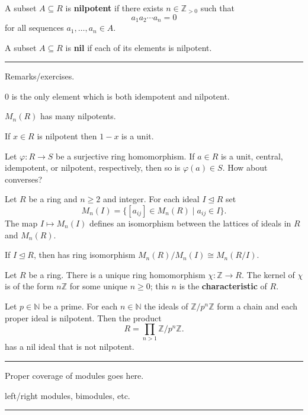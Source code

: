 \documentclass[12pt]{article}
\newcommand{\keyword}[1]{\textbf{#1}}
\newcommand{\sepline}{\rule{\textwidth}{0.4pt}}
\theoremstyle{definition}
\newcommand{\N}{\mathbb{N}}
\newcommand{\Z}{\mathbb{Z}}
\renewcommand{\phi}{\varphi}
\newcommand{\<}{\left\langle}
\renewcommand{\>}{\right\rangle}
\newcommand{\iso}{\cong}
\newcommand{\seq}{\subseteq}
\newcommand{\teq}{\trianglelefteq}
\renewcommand{\_}[1]{{_{#1}}}
\begin{document}
A subset $A \seq R$ is \keyword{nilpotent} if there exists $n \in \Z_{>0}$ such that
\[
    a_1a_2 \cdots a_n = 0
\]
for all sequences $a_1, \dots, a_n \in A$.

A subset $A \seq R$ is \keyword{nil} if each of its elements is nilpotent.

\sepline

Remarks/exercises.

$0$ is the only element which is both idempotent and nilpotent.

$M_n(R)$ has many nilpotents.

If $x \in R$ is nilpotent then $1 - x$ is a unit.

Let $\phi : R \to S$ be a surjective ring homomorphism.
If $a \in R$ is a unit, central, idempotent, or nilpotent, respectively, then so is $\phi(a) \in S$.
How about converses?

Let $R$ be a ring and $n \geq 2$ and integer.
For each ideal $I \teq R$ set
\[
    M_n(I) = \{[a_{ij}] \in M_n(R) \mid a_{ij} \in I\}.
\]
The map $I \mapsto M_n(I)$ defines an isomorphism between the lattices of ideals in $R$ and $M_n(R)$.

If $I \teq R$, then has ring isomorphism $M_n(R)/M_n(I) \iso M_n(R/I)$.


Let $R$ be a ring.
There is a unique ring homomorphism $\chi : \Z \to R$.
The kernel of $\chi$ is of the form $n\Z$ for some unique $n \geq 0$; this $n$ is the \keyword{characteristic} of $R$.


Let $p \in \N$ be a prime.
For each $n \in \N$ the ideals of $\Z/p^n\Z$ form a chain and each proper ideal is nilpotent.
Then the product
\[
    R = \prod_{n > 1} \Z/p^n\Z.
\]
has a nil ideal that is not nilpotent.

\sepline

Proper coverage of modules goes here.

left/right modules, bimodules, etc.

\sepline
\end{document}
